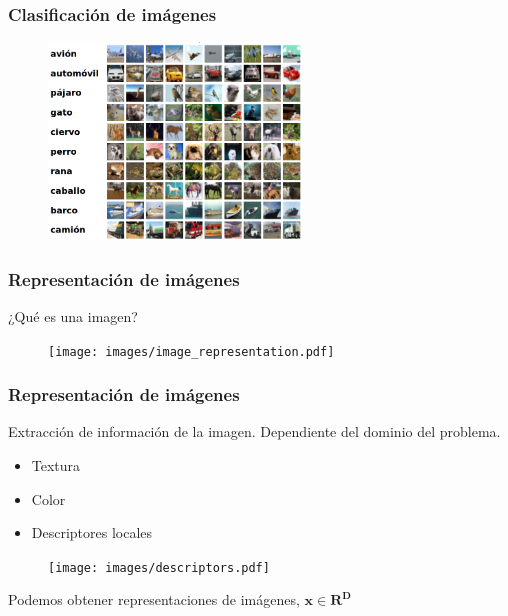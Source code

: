\documentclass{beamer}
\begin{document}
\begin{frame}
\frametitle{Clasificación de imágenes}
\begin{figure}
    \centering
    \includegraphics[width=0.6\textwidth]{images/ciphar10.png}
\end{figure}
\end{frame}




\begin{frame}[plain]
\frametitle{Representación de imágenes}
¿Qué es una imagen?
\begin{figure}
    \centering
    \texttt{[image: images/image\_representation.pdf]}
\end{figure}
\end{frame}




\begin{frame}[plain]
\frametitle{Representación de imágenes}
Extracción de información de la imagen.
\vfill
Dependiente del dominio del problema.
\vfill
\begin{itemize}
    \item Textura
    \item Color
    \item Descriptores locales
\end{itemize}
\vfill
\begin{figure}
    \centering
    \texttt{[image: images/descriptors.pdf]}
\end{figure}
\vfill
Podemos obtener representaciones de imágenes, \(\boldsymbol{x} \in \boldsymbol{R^{D}}\)
\end{frame}
\end{document}
